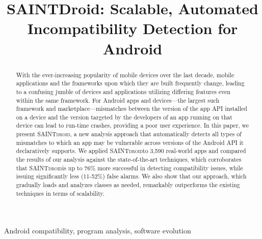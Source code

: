 \documentclass[10pt,journal]{IEEEtran}
\makeatletter
\def \@approach{\textsc{SAINTdroid}}
\makeatother
\begin{document}
\title{SAINTDroid: Scalable, Automated Incompatibility Detection for Android} 

\maketitle

\begin{abstract}
With the ever-increasing popularity of mobile devices over
the last decade, mobile applications and the frameworks upon
which they are built frequently change, leading to a
confusing jumble of devices and applications utilizing
differing features even within the same framework. For
Android apps and devices---the largest such framework and
marketplace---mismatches between the version of the app API
installed on a device and the version targeted by the
developers of an app running on that device can lead to
run-time crashes, providing a poor user experience. In this
paper, we present \@approach, a new analysis approach that
automatically detects all types of mismatches to which an
app may be vulnerable across versions of the Android API it
declaratively supports. 
We applied \@approach to 3,590 real-world apps and compared the results of our analysis against the state-of-the-art techniques,
which corroborates that \@approach is up to 76\% more successful in detecting compatibility issues, while issuing significantly less (11-52\%) false alarms.
We also show that our approach, which gradually loads and analyzes classes as needed, remarkably outperforms the existing techniques in terms of scalability.

\end{abstract}



\begin{IEEEkeywords}
Android compatibility, program analysis, software evolution
\end{IEEEkeywords}










%


\end{document}
